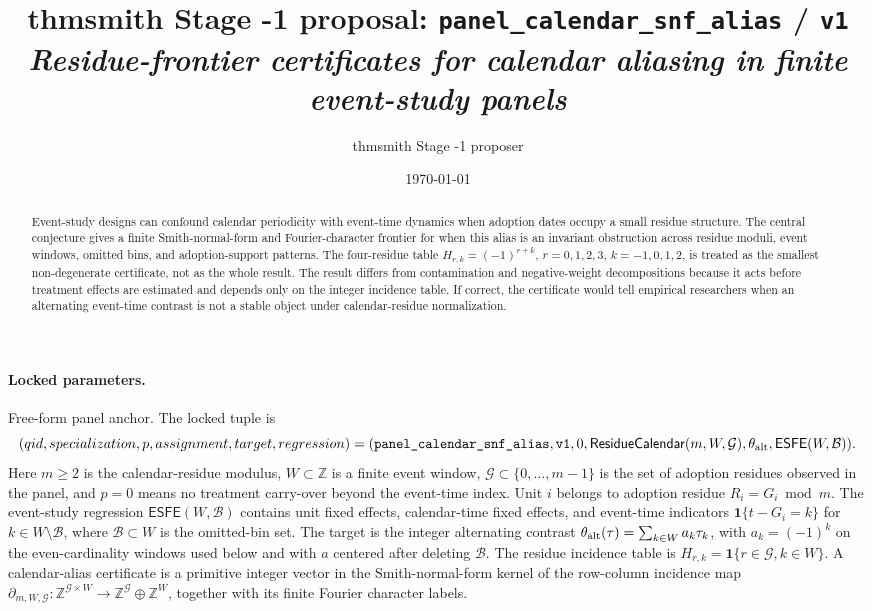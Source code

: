 \documentclass[11pt]{article}
\title{thmsmith Stage -1 proposal: \texttt{panel\_calendar\_snf\_alias} / \texttt{v1}%
  \\ \large\textit{Residue-frontier certificates for calendar aliasing in finite event-study panels}}
\author{thmsmith Stage -1 proposer}
\date{\today}
\newcommand{\one}{\mathbf{1}}
\theoremstyle{definition}
\theoremstyle{plain}
\theoremstyle{remark}
\begin{document}
\maketitle


\paragraph{Locked parameters.}
Free-form panel anchor. The locked tuple is
\[
(qid, specialization, p, assignment, target, regression)
=(\texttt{panel\_calendar\_snf\_alias},\texttt{v1},0,\mathsf{ResidueCalendar}(m,W,\mathcal G),\theta_{\rm alt},\mathsf{ESFE}(W,\mathcal B)).
\]
Here \(m\ge 2\) is the calendar-residue modulus, \(W\subset \mathbb Z\) is a finite event window, \(\mathcal G\subset \{0,\ldots,m-1\}\) is the set of adoption residues observed in the panel, and \(p=0\) means no treatment carry-over beyond the event-time index. Unit \(i\) belongs to adoption residue \(R_i=G_i \bmod m\). The event-study regression \(\mathsf{ESFE}(W,\mathcal B)\) contains unit fixed effects, calendar-time fixed effects, and event-time indicators \(\one\{t-G_i=k\}\) for \(k\in W\setminus \mathcal B\), where \(\mathcal B\subset W\) is the omitted-bin set. The target is the integer alternating contrast \(\theta_{\rm alt}(\tau)=\sum_{k\in W} a_k\tau_k\), with \(a_k=(-1)^k\) on the even-cardinality windows used below and with \(a\) centered after deleting \(\mathcal B\). The residue incidence table is \(H_{r,k}=\one\{r\in\mathcal G,k\in W\}\). A calendar-alias certificate is a primitive integer vector in the Smith-normal-form kernel of the row-column incidence map \(\partial_{m,W,\mathcal G}:\mathbb Z^{\mathcal G\times W}\to \mathbb Z^{\mathcal G}\oplus\mathbb Z^W\), together with its finite Fourier character labels.

\begin{abstract}
Event-study designs can confound calendar periodicity with event-time dynamics when adoption dates occupy a small residue structure. The central conjecture gives a finite Smith-normal-form and Fourier-character frontier for when this alias is an invariant obstruction across residue moduli, event windows, omitted bins, and adoption-support patterns. The four-residue table \(H_{r,k}=(-1)^{r+k}\), \(r=0,1,2,3\), \(k=-1,0,1,2\), is treated as the smallest non-degenerate certificate, not as the whole result. The result differs from contamination and negative-weight decompositions because it acts before treatment effects are estimated and depends only on the integer incidence table. If correct, the certificate would tell empirical researchers when an alternating event-time contrast is not a stable object under calendar-residue normalization.
\end{abstract}
\end{document}
